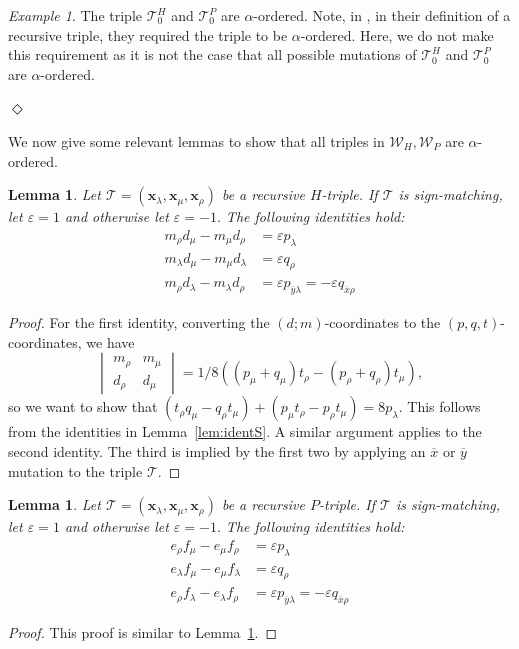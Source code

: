 \documentclass[11pt, reqno]{amsart}
\newtheorem{lemma}[thm]{Lemma}
\theoremstyle{remark}
\numberwithin{equation}{subsection}
\numberwithin{figure}{section}
\theoremstyle{customremark}
\newtheorem{example_no_diamond}[thm]{Example}
\newenvironment{example}{\begin{example_no_diamond} } {\hfill$\er$ \end{example_no_diamond}}
\newcommand{\Tt}{\mathcal{T}}
\newcommand{\ovx}{{\ov{x}}}
\newcommand{\ov}{\overline}
\newcommand{\al}{{\alpha}}
\newcommand{\la}{{\lambda}}
\newcommand{\er}{{\Diamond}}
\newcommand{\eps}{\varepsilon}
\begin{document}
\begin{example}
	The triple $\Tt_0^H$ and $\Tt_0^P$ are $\al$-ordered. Note, in \cite{MMW}, in their definition of a recursive triple, they required the triple to be $\al$-ordered. Here, we do not make this requirement as it is not the case that all possible mutations of $\Tt_0^H$ and $\Tt_0^P$ are $\al$-ordered. 


\end{example} 



We now give some relevant lemmas to show that all triples in $\mathcal{W}_H,\mathcal{W}_P$ are $\al$-ordered. 


\begin{lemma} \label{lem:mDrelations} 
    Let $\Tt=(\bm{x}_\la,\bm{x}_\mu,\bm{x}_\rho)$ be a recursive $H$-triple. If $\Tt$ is sign-matching, let $\eps=1$ and otherwise let $\eps=-1.$ The following identities hold:
    \begin{align*}
        m_\rho d_\mu-m_\mu d_\rho&=\eps p_\la \\
        m_\la d_\mu-m_\mu d_\la&=\eps q_\rho \\
        m_\rho d_\la-m_\la d_\rho&=\eps p_{\ov y\la}=-\eps q_{\ovx\rho} 
    \end{align*}
\end{lemma}
\begin{proof}
  For the first identity, converting the $(d;m)$-coordinates to the $(p,q,t)$-coordinates, we have
    \[ \begin{vmatrix} m_\rho & m_\mu \\  d_\rho & d_\mu \end{vmatrix}=1/8((p_\mu+q_\mu)t_\rho-(p_\rho+q_\rho)t_\mu) ,\]
    so we want to show that $(t_\rho q_\mu-q_\rho t_\mu)+(p_\mu t_\rho-p_\rho t_\mu)=8p_\la$. This follows from the identities in Lemma~\ref{lem:identS}. A similar argument applies to the second identity.    The third is implied by the first two by applying an $\ov{x}$ or $\ov{y}$ mutation to the triple $\Tt.$ 

    
\end{proof}


\begin{lemma} \label{lem:eFrelations}
       Let $\Tt=(\bm{x}_\la,\bm{x}_\mu,\bm{x}_\rho)$ be a recursive $P$-triple. If $\Tt$ is sign-matching, let $\eps=1$ and otherwise let $\eps=-1.$ The following identities hold:
    \begin{align*}
        e_\rho f_\mu-e_\mu f_\rho&=\eps p_\la \\
        e_\la f_\mu-e_\mu f_\la&=\eps q_\rho \\
        e_\rho f_\la-e_\la f_\rho&=\eps p_{\ov y\la}=-\eps q_{\ovx\rho} 
    \end{align*}
\end{lemma}
\begin{proof}
    This proof is similar to Lemma~\ref{lem:mDrelations}. 
\end{proof}
\end{document}
